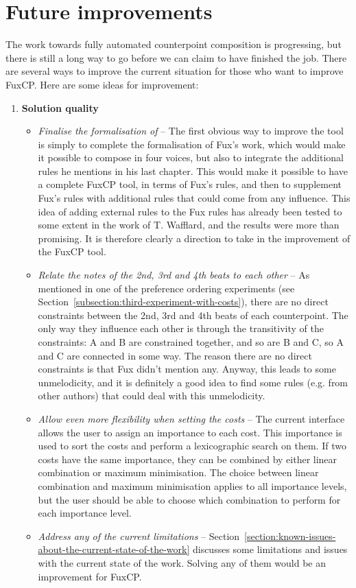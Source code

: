 \section{Future improvements}
The work towards fully automated counterpoint composition is progressing, but there is still a long way to go before we can claim to have finished the job. There are several ways to improve the current situation for those who want to improve FuxCP. Here are some ideas for improvement:
\begin{enumerate}
  \item \textbf{Solution quality}
  \begin{itemize}
    \item \textit{Finalise the formalisation of \gap} -- The first obvious way to improve the tool is simply to complete the formalisation of Fux's work, which would make it possible to compose in four voices, but also to integrate the additional rules he mentions in his last chapter. This would make it possible to have a complete FuxCP tool, in terms of Fux's rules, and then to supplement Fux's rules with additional rules that could come from any influence. This idea of adding external rules to the Fux rules has already been tested to some extent in the work of T. Wafflard, and the results were more than promising. It is therefore clearly a direction to take in the improvement of the FuxCP tool.
    \item \textit{Relate the notes of the 2nd, 3rd and 4th beats to each other} -- As mentioned in one of the preference ordering experiments (see Section~\ref{subsection:third-experiment-with-costs}), there are no direct constraints between the 2nd, 3rd and 4th beats of each counterpoint. The only way they influence each other is through the transitivity of the constraints: A and B are constrained together, and so are B and C, so A and C are connected in some way. The reason there are no direct constraints is that Fux didn't mention any. Anyway, this leads to some unmelodicity, and it is definitely a good idea to find some rules (e.g. from other authors) that could deal with this unmelodicity. 
    \item \textit{Allow even more flexibility when setting the costs} -- The current interface allows the user to assign an importance to each cost. This importance is used to sort the costs and perform a lexicographic search on them. If two costs have the same importance, they can be combined by either linear combination or maximum minimisation. The choice between linear combination and maximum minimisation applies to all importance levels, but the user should be able to choose which combination to perform for each importance level.
    \item \textit{Address any of the current limitations} -- Section~\ref{section:known-issues-about-the-current-state-of-the-work} discusses some limitations and issues with the current state of the work. Solving any of them would be an improvement for FuxCP.
  \end{itemize}
  

\end{enumerate}
